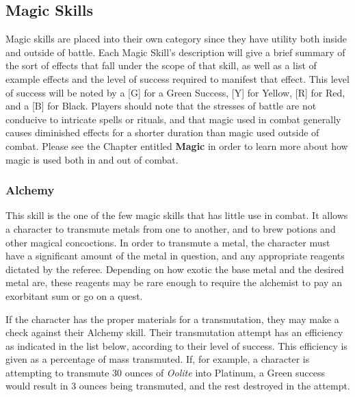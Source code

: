 \documentclass[oneside]{book}
\begin{document}
\begin{multicols}{2}
\section{Magic Skills}
Magic skills are placed into their own category since they have utility both inside and outside of battle. Each Magic Skill's description will give a brief summary of the sort of effects that fall under the scope of that skill, as well as a list of example effects and the level of success required to manifest that effect. This level of success will be noted by a [G] for a Green Success, [Y] for Yellow, [R] for Red, and a [B] for Black. Players should note that the stresses of battle are not conducive to intricate spells or rituals, and that magic used in combat generally causes diminished effects for a shorter duration than magic used outside of combat. Please see the Chapter entitled \textbf{Magic} in order to learn more about how magic is used both in and out of combat.

\subsubsection{Alchemy}
This skill is the one of the few magic skills that has little use in combat. It allows a character to transmute metals from one to another, and to brew potions and other magical concoctions. In order to transmute a metal, the character must have a significant amount of the metal in question, and any appropriate reagents dictated by the referee. Depending on how exotic the base metal and the desired metal are, these reagents may be rare enough to require the alchemist to pay an exorbitant sum or go on a quest.

If the character has the proper materials for a transmutation, they may make a check against their Alchemy skill. Their transmutation attempt has an efficiency as indicated in the list below, according to their level of success. This efficiency is given as a percentage of mass transmuted. If, for example, a character is attempting to transmute 30 ounces of \emph{Oolite} into Platinum, a Green success would result in 3 ounces being transmuted, and the rest destroyed in the attempt. 


\end{multicols}
\end{document}
